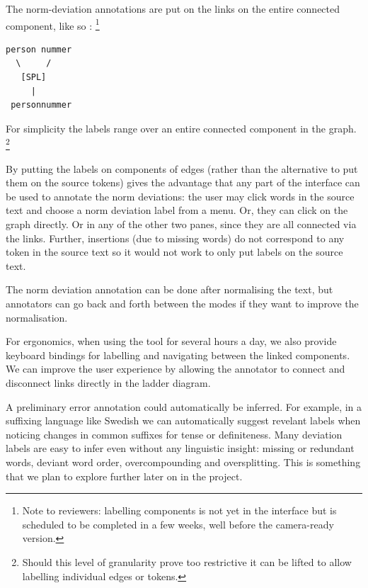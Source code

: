 \documentclass[10pt, a4paper]{article}
\newcommand{\dan}[1]{{\color{Fuchsia}{Dan: #1}}}
\newcommand{\mats}[1]{{\color{Blue}{Mats: #1}}}
\begin{document}
\mats{Clarify if this is about what is added graphically
by the annotator or if it is about the representation, or both.}

The norm-deviation annotations are put on the links
on the entire connected component, like so \dan{in ascii art for now}:
\footnote{Note to reviewers: labelling components is not yet in the interface
but is scheduled to be completed in a few weeks, well before the camera-ready
version.}

\begin{verbatim}
person nummer
  \     /
   [SPL]
     |
 personnummer
\end{verbatim}

For simplicity the labels range over an entire connected
component in the graph.
\footnote{Should this level of granularity prove too restrictive
it can be lifted to allow labelling individual edges or tokens.}

By putting the labels on components of edges
(rather than the alternative to put them on the source tokens) gives the advantage that any part of the interface can be used to annotate the norm deviations:
the user may click words in the source text and choose a norm deviation label from a menu. Or, they can click on the graph directly. Or in any of the other two panes,
since they are all connected via the links.
Further, insertions (due to missing words) do not correspond to any token in the source text so it would not work to only put labels on the source text.

The norm deviation annotation can be done after normalising the text, but annotators can go back and forth between the modes
if they want to improve the normalisation.

For ergonomics, when using the tool for several hours a day,
we also provide keyboard bindings for labelling and navigating between
the linked components.
We can improve the user experience by allowing the annotator to connect
and disconnect links directly in the ladder diagram.

A preliminary error annotation could automatically be inferred.
For example, in a suffixing language like Swedish we can automatically
suggest revelant labels when noticing changes in common suffixes for tense
or definiteness.
Many deviation labels are easy to infer even without any linguistic
insight: missing or redundant words, deviant word order, overcompounding
and oversplitting.
This is something that we plan to explore further later on in the project.
\end{document}
